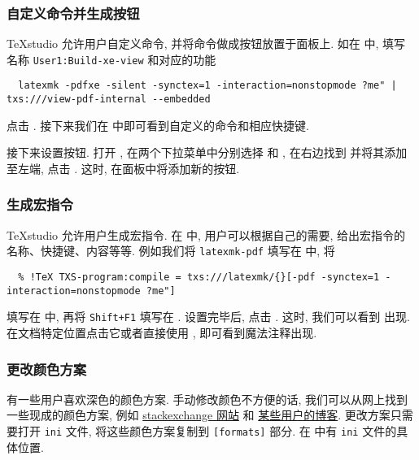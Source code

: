 \subsubsection{自定义命令并生成按钮}

\TeX studio 允许用户自定义命令, 并将命令做成按钮放置于面板上.
如在  中,
填写名称 \texttt{User1:Build-xe-view}
和对应的功能
\begin{lstlisting}
  latexmk -pdfxe -silent -synctex=1 -interaction=nonstopmode ?me" | txs:///view-pdf-internal --embedded
\end{lstlisting}
点击 . 
接下来我们在  中即可看到自定义的命令和相应快捷键.

接下来设置按钮.
打开 ,
在两个下拉菜单中分别选择  和 ,
在右边找到  并将其添加至左端,
点击 . 
这时, 在面板中将添加新的按钮. 

\subsubsection{生成宏指令}

\TeX studio 允许用户生成宏指令.
在  中, 用户可以根据自己的需要,
给出宏指令的名称、快捷键、内容等等.
例如我们将 \texttt{latexmk-pdf} 填写在  中,
将
\begin{lstlisting}
  % !TeX TXS-program:compile = txs:///latexmk/{}[-pdf -synctex=1 -interaction=nonstopmode ?me"]
\end{lstlisting}
填写在  中,
再将 \texttt{Shift+F1} 填写在 .
设置完毕后, 点击 .
这时, 我们可以看到  出现.
在文档特定位置点击它或者直接使用 , 即可看到魔法注释出现.

\subsubsection{更改颜色方案}

有一些用户喜欢深色的颜色方案.
手动修改颜色不方便的话, 我们可以从网上找到一些现成的颜色方案,
例如
\href{https://tex.stackexchange.com/questions/108315/how-can-i-set-a-dark-theme-in-texstudio}{stackexchange 网站}%
和%
\href{https://robjhyndman.com/hyndsight/dark-themes-for-writing/}{某些用户的博客}.
更改方案只需要打开 \texttt{ini} 文件,
将这些颜色方案复制到 \texttt{[formats]} 部分.
在 
中有 \texttt{ini} 文件的具体位置.

